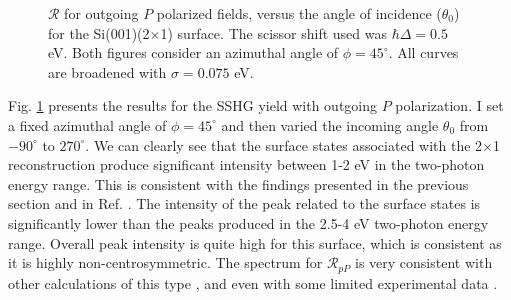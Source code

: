 \begin{figure}[H]
\centering
{}\hfill
{}
\caption{$\mathcal{R}$ for outgoing $P$ polarized fields, versus the angle of
    incidence ($\theta_{0}$) for the Si(001)(2$\times$1) surface. The scissor
    shift used was $\hbar\Delta = 0.5$ eV. Both figures consider an azimuthal
    angle of $\phi = 45^{\circ}$. All curves are broadened with $\sigma = 0.075$
    eV.}
\label{fig:2x1rP3d}
\end{figure}

Fig. \ref{fig:2x1rP3d} presents the results for the SSHG yield with outgoing $P$
polarization. I set a fixed azimuthal angle of $\phi = 45^{\circ}$ and then
varied the incoming angle $\theta_{0}$ from $-90^{\circ}$ to $270^{\circ}$. We
can clearly see that the surface states associated with the 2$\times$1
reconstruction produce significant intensity between 1-2 eV in the two-photon
energy range. This is consistent with the findings presented in the previous
section and in Ref. \cite{andersonPRB15}. The intensity of the peak related to
the surface states is significantly lower than the peaks produced in the 2.5-4
eV two-photon energy range. Overall peak intensity is quite high for this
surface, which is consistent as it is highly non-centrosymmetric. The spectrum
for $\mathcal{R}_{pP}$ is very consistent with other calculations of this type
\cite{tancognedejean:tel-01235611}, and even with some limited experimental data
\cite{powerPRL95}.

